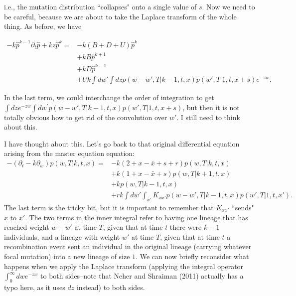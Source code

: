 \documentclass[10pt]{revtex4}
\begin{document}
i.e., the mutation distribution ``collapses" onto a single value of $s$.
Now we need to be careful, because we are about to take the Laplace transform of the whole thing. As before, we have

\begin{align*}
-k\hat{p}^{k-1} \partial_t\hat{p} + kz\hat{p}^k = &-k(B+D+U) \hat{p}^k \\
& + kB\hat{p}^{k+1} \\
& +kD\hat{p}^{k-1} \\
&+Uk \int dw\prime \int dz p(w-w\prime , T|k-1, t, x) p(w\prime,T|1,t,x+s) e^{-zw}.
\end{align*}

In the last term, we could interchange the order of integration to get $\int dz e^{-zw} \int dw^\prime p(w-w\prime , T|k-1, t, x) p(w\prime,T|1,t,x+s)$, but then it is not totally obvious how to get rid of the convolution over $w\prime$. I still need to think about this.

I have thought about this.
Let's go back to that original differential equation arising from the master equation equation:
\begin{align*}
-(\partial_t -k\partial_w) p(w,T|k,t,x) = &-k(2+x-\bar{x}+s+r)p(w,T|k,t,x) \\
& + k(1+x-\bar{x}+s)p(w,T|k+1,t,x) \\
& +kp(w,T|k-1,t,x) \\
&+rk \int dw\prime \int_{x\prime} K_{x x\prime} p(w-w\prime , T|k-1, t, x) p(w\prime,T|1,t,x\prime).
\end{align*}
The last term is the tricky bit, but it is important to remember that $K_{xx\prime}$ ``sends" $x$ to $x\prime$.
The two terms in the inner integral refer to having one lineage that has reached weight $w - w\prime$ at time $T$, given that at time $t$ there were $k-1$ individuals, and a lineage with weight $w\prime$ at time $T$, given that at time $t$ a recombination event sent an individual in the original lineage  (carrying whatever focal mutation) into a new lineage of size $1$.
We can now briefly reconsider what happens when we apply the Laplace transform (applying the integral operator $\int_0^\infty dw e^{-zw}$ to both sides--note that Neher and Shraiman (2011) actually has a typo here, as it uses $dz$ instead) to both sides.
\end{document}
